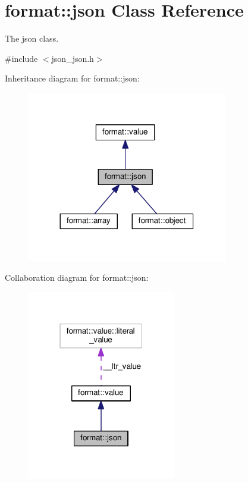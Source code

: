 \hypertarget{classformat_1_1json}{}\section{format\+:\+:json Class Reference}
\label{classformat_1_1json}


The json class.  




{\ttfamily \#include $<$json\+\_\+json.\+h$>$}



Inheritance diagram for format\+:\+:json\+:
\nopagebreak
\begin{figure}[H]
\begin{center}
\leavevmode
\includegraphics[width=248pt]{classformat_1_1json__inherit__graph}
\end{center}
\end{figure}


Collaboration diagram for format\+:\+:json\+:
\nopagebreak
\begin{figure}[H]
\begin{center}
\leavevmode
\includegraphics[width=183pt]{classformat_1_1json__coll__graph}
\end{center}
\end{figure}
